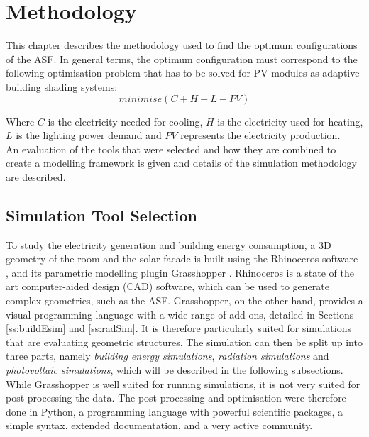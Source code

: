 \chapter{Methodology}
\label{c:methodology}
	


	This chapter describes the methodology used to find the optimum configurations of the ASF. In general terms, the optimum configuration must correspond to the following optimisation problem that has to be solved for PV modules as adaptive building shading systems:\\
	\begin{equation}
			minimise(C+H+L-PV)
	      	\label{e:minimise}
	\end{equation}

	Where $C$ is the electricity needed for cooling, $H$ is the electricity used for heating, $L$ is the lighting power demand and $PV$ represents the electricity production. \\
	An evaluation of the tools that were selected and how they are combined to create a modelling framework is given and details of the simulation methodology are described.

	\section{Simulation Tool Selection}


		To study the electricity generation and building energy consumption, a 3D geometry of the room and the solar facade is built using the Rhinoceros software \cite{Rhino}, and its parametric modelling plugin Grasshopper \cite{grasshopper}. Rhinoceros is a state of the art computer-aided design (CAD) software, which can be used to generate complex geometries, such as the ASF. Grasshopper, on the other hand, provides a visual programming language with a wide range of add-ons, detailed in Sections \ref{ss:buildEsim} and \ref{ss:radSim}. It is therefore particularly suited for simulations that are evaluating geometric structures. The simulation can then be split up into three parts, namely \emph{building energy simulations}, \emph{radiation simulations} and \emph{photovoltaic simulations}, which will be described in the following subsections. While Grasshopper is well suited for running simulations, it is not very suited for post-processing the data. The post-processing and optimisation were therefore done in Python, a programming language with powerful scientific packages, a simple syntax, extended documentation, and a very active community.  %

